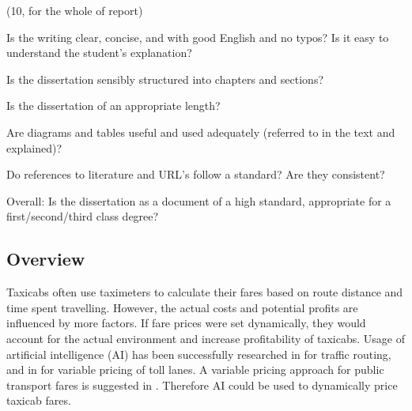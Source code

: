 (10, for the whole of report)

Is the writing clear, concise, and with good English and no typos? Is it easy
to understand the student’s explanation?

Is the dissertation sensibly structured into chapters and sections?

Is the dissertation of an appropriate length?

Are diagrams and tables useful and used adequately (referred to in the text and
explained)?

Do references to literature and URL’s follow a standard? Are they consistent?

Overall: Is the dissertation as a document of a high standard, appropriate for
a first/second/third class degree?

\subsection{Overview}


Taxicabs often use taximeters to calculate their fares based on route distance
and time spent travelling. However, the actual costs and potential profits are
influenced by more factors. If fare prices were set dynamically, they would
account for the actual environment and increase profitability of taxicabs.
Usage of artificial intelligence (AI) has been successfully researched in
\cite{Tavares2012ai+routing} for traffic routing, and in
\cite{Lou2011ai+highways} for variable pricing of toll lanes. A variable
pricing approach for public transport fares is suggested in
\cite{Emele2013pricing+rural}. Therefore AI could be used to dynamically price
taxicab fares.
